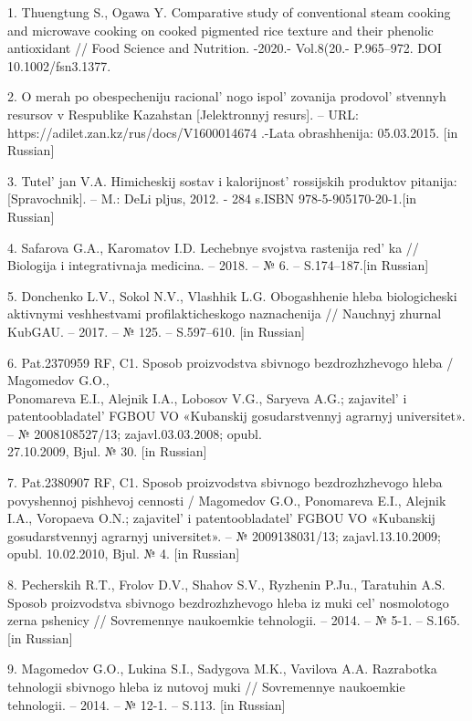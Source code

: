 \begin{references}
1. Thuengtung S., Ogawa Y. Comparative study of conventional steam
cooking and microwave cooking on cooked pigmented rice texture and their
phenolic antioxidant // Food Science and Nutrition. -2020.- Vol.8(20.-
P.965--972. DOI 10.1002/fsn3.1377.

2. O merah po obespecheniju racional' nogo
ispol' zovanija prodovol' stvennyh
resursov v Respublike Kazahstan {[}Jelektronnyj resurs{]}. -- URL:
https://adilet.zan.kz/rus/docs/V1600014674 .-Lata obrashhenija:
05.03.2015. {[}in Russian{]}

3. Tutel' jan V.A. Himicheskij sostav i
kalorijnost'{} rossijskih produktov pitanija:
{[}Spravochnik{]}. -- M.: DeLi pljus, 2012. - 284 s.ISBN
978-5-905170-20-1.{[}in Russian{]}

4. Safarova G.A., Karomatov I.D. Lechebnye svojstva rastenija
red' ka // Biologija i integrativnaja medicina. -- 2018.
-- № 6. -- S.174--187.{[}in Russian{]}

5. Donchenko L.V., Sokol N.V., Vlashhik L.G. Obogashhenie hleba
biologicheski aktivnymi veshhestvami profilakticheskogo naznachenija //
Nauchnyj zhurnal KubGAU. -- 2017. -- № 125. -- S.597--610. {[}in
Russian{]}

6. Pat.2370959 RF, C1. Sposob proizvodstva sbivnogo bezdrozhzhevogo
hleba / Magomedov G.O., \\Ponomareva E.I., Alejnik I.A., Lobosov V.G.,
Saryeva A.G.; zajavitel'{} i
patentoobladatel'{} FGBOU VO «Kubanskij gosudarstvennyj
agrarnyj universitet». -- № 2008108527/13; zajavl.03.03.2008; opubl.\\
27.10.2009, Bjul. № 30. {[}in Russian{]}

7. Pat.2380907 RF, C1. Sposob proizvodstva sbivnogo bezdrozhzhevogo
hleba povyshennoj pishhevoj cennosti / Magomedov G.O., Ponomareva E.I.,
Alejnik I.A., Voropaeva O.N.; zajavitel'{} i
patentoobladatel'{} FGBOU VO «Kubanskij gosudarstvennyj
agrarnyj universitet». -- № 2009138031/13; zajavl.13.10.2009; opubl.
10.02.2010, Bjul. № 4. {[}in Russian{]}

8. Pecherskih R.T., Frolov D.V., Shahov S.V., Ryzhenin P.Ju., Taratuhin
A.S. Sposob proizvodstva sbivnogo bezdrozhzhevogo hleba iz muki
cel' nosmolotogo zerna pshenicy // Sovremennye naukoemkie
tehnologii. -- 2014. -- № 5-1. -- S.165. {[}in Russian{]}

9. Magomedov G.O., Lukina S.I., Sadygova M.K., Vavilova A.A. Razrabotka
tehnologii sbivnogo hleba iz nutovoj muki // Sovremennye naukoemkie
tehnologii. -- 2014. -- № 12-1. -- S.113. {[}in Russian{]}


\end{references}
